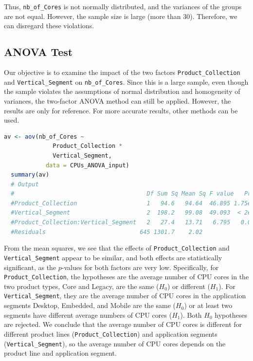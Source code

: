 Thus, \texttt{nb\_of\_Cores} is not normally distributed, and the variances of the groups are not equal. However, the sample size is large (more than $30$). Therefore, we can disregard these violations.

\subsection{ANOVA Test}

Our objective is to examine the impact of the two factors \texttt{Product\_Collection} and \texttt{Vertical\_Segment} on \texttt{nb\_of\_Cores}. Since this is a large sample, even though the sample violates the assumptions of normal distribution and homogeneity of variances, the two-factor ANOVA method can still be applied. However, the results are only for reference. For more accurate results, other methods can be used.

\begin{lstlisting}[language=R]
  av <- aov(nb_of_Cores ~ 
              Product_Collection * 
              Vertical_Segment,
            data = CPUs_ANOVA_input)
  summary(av)
  # Output
  #                                      Df Sum Sq Mean Sq F value   Pr(>F)    
  #Product_Collection                    1   94.6   94.64  46.895 1.75e-11 ***
  #Vertical_Segment                      2  198.2   99.08  49.093  < 2e-16 ***
  #Product_Collection:Vertical_Segment   2   27.4   13.71   6.795   0.0012 ** 
  #Residuals                           645 1301.7    2.02    
\end{lstlisting}

From the mean squares, we see that the effects of \texttt{Product\_Collection} and \texttt{Vertical\_Segment} appear to be similar, and both effects are statistically significant, as the $p$-values for both factors are very low. Specifically, for \texttt{Product\_Collection}, the hypotheses are the average number of CPU cores in the two product types, Core and Legacy, are the same ($H_0$) or different ($H_1$). For \texttt{Vertical\_Segment}, they are the average number of CPU cores in the application segments Desktop, Embedded, and Mobile are the same ($H_0$) or at least two segments have different average numbers of CPU cores ($H_1$). Both $H_0$ hypotheses are rejected. We conclude that the average number of CPU cores is different for different product lines (\texttt{Product\_Collection}) and application segments (\texttt{Vertical\_Segment}), so the average number of CPU cores depends on the product line and application segment.